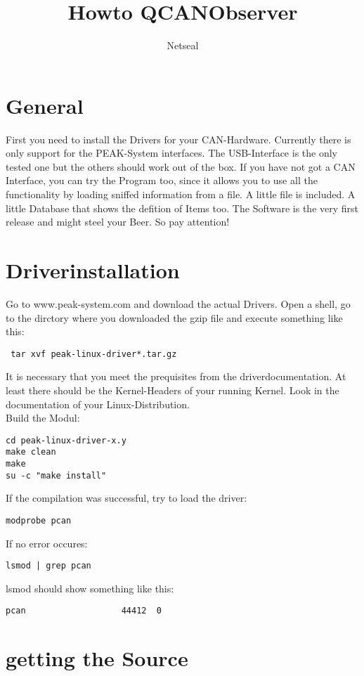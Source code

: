 \documentclass[a4paper,10pt]{article}
\title{Howto QCANObserver}
\author{Netseal}
\begin{document}
\maketitle
\section{General}
First you need to install the Drivers for your CAN-Hardware. Currently there is only support for the PEAK-System interfaces. The USB-Interface is the only tested one but the others should work out of the box. If you have not got a CAN Interface, you can try the Program too, since it allows you to use all the functionality by loading sniffed information from a file. A little file is included. A little Database that shows the defition of Items too. The Software is the very first release and might steel your Beer. So pay attention!


\section{Driverinstallation}
Go to www.peak-system.com and download the actual Drivers.
Open a shell, go to the dirctory where you downloaded the gzip file and execute something like this:
\begin{verbatim}
 tar xvf peak-linux-driver*.tar.gz
\end{verbatim} 
It is necessary that you meet the prequisites from the driverdocumentation.
At least there should be the Kernel-Headers of your running Kernel. Look in the documentation of your Linux-Distribution.\\
Build the Modul:
\begin{verbatim}
cd peak-linux-driver-x.y
make clean
make
su -c "make install"
\end{verbatim} 
If the compilation was successful, try to load the driver:

\begin{verbatim}
modprobe pcan
\end{verbatim} 
If no error occures:

\begin{verbatim}
lsmod | grep pcan
\end{verbatim} 
lsmod should show something like this:

\begin{verbatim}
pcan                   44412  0
\end{verbatim} 

\section{getting the Source}
\end{document}
